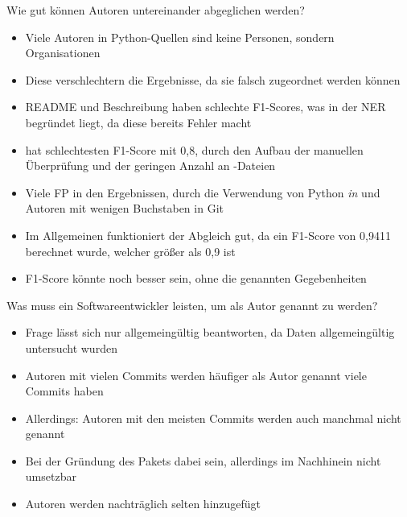 \documentclass[%
    handout,
    aspectratio=1610,
    10pt,
    onlytextwidth, %
]{beamer}
\begin{document}
\begin{frame}{Wie gut können Autoren untereinander abgeglichen werden?}
    \begin{itemize}
        \item Viele Autoren in Python-Quellen sind keine Personen, sondern Organisationen
        \item Diese verschlechtern die Ergebnisse, da sie falsch zugeordnet werden können
        \item README und Beschreibung haben schlechte F1-Scores, was in der NER begründet liegt, da diese bereits Fehler macht
        \item {} hat schlechtesten F1-Score mit 0,8, durch den Aufbau der manuellen Überprüfung und der geringen Anzahl an -Dateien
        \item Viele FP in den Ergebnissen, durch die Verwendung von Python \emph{in} und Autoren mit wenigen Buchstaben in Git
        \item Im Allgemeinen funktioniert der Abgleich gut, da ein F1-Score von 0,9411 berechnet wurde, welcher größer als 0,9 ist
        \item F1-Score könnte noch besser sein, ohne die genannten Gegebenheiten
    \end{itemize}
\end{frame}

\begin{frame}{Was muss ein Softwareentwickler leisten, um als Autor genannt zu werden?}
    \begin{itemize}
        \item Frage lässt sich nur allgemeingültig beantworten, da Daten allgemeingültig untersucht wurden
        \item Autoren mit vielen Commits werden häufiger als Autor genannt \rightarrow{} viele Commits haben
        \item Allerdings: Autoren mit den meisten Commits werden auch manchmal nicht genannt
        \item Bei der Gründung des Pakets dabei sein, allerdings im Nachhinein nicht umsetzbar
        \item Autoren werden nachträglich selten hinzugefügt %
    \end{itemize}
\end{frame}
\end{document}
